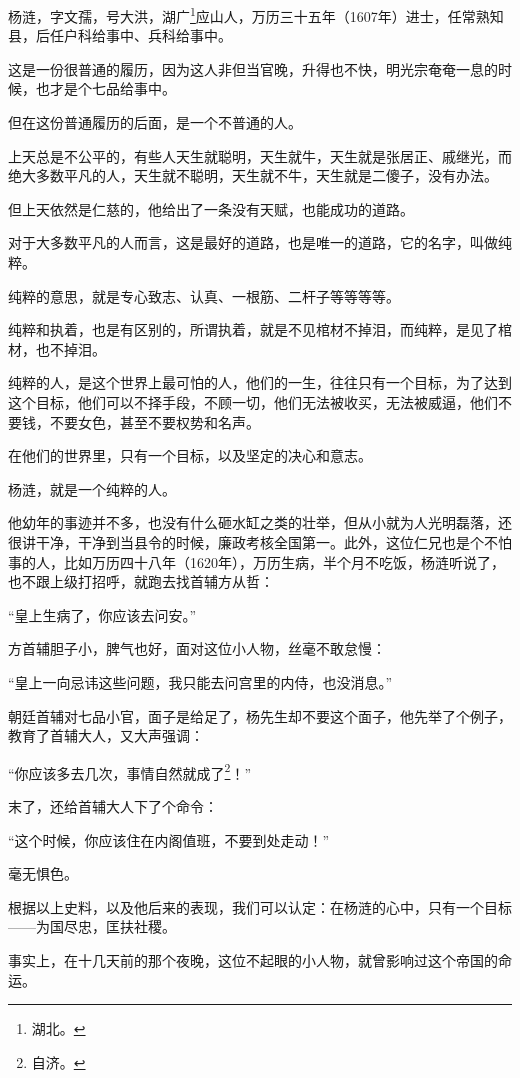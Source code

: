 \begin{multicols}{\theparacolNo}
杨涟，字文孺，号大洪，湖广\footnote{湖北。}应山人，万历三十五年（1607年）进士，任常熟知县，后任户科给事中、兵科给事中。

这是一份很普通的履历，因为这人非但当官晚，升得也不快，明光宗奄奄一息的时候，也才是个七品给事中。

但在这份普通履历的后面，是一个不普通的人。

上天总是不公平的，有些人天生就聪明，天生就牛，天生就是张居正、戚继光，而绝大多数平凡的人，天生就不聪明，天生就不牛，天生就是二傻子，没有办法。

但上天依然是仁慈的，他给出了一条没有天赋，也能成功的道路。

对于大多数平凡的人而言，这是最好的道路，也是唯一的道路，它的名字，叫做纯粹。

纯粹的意思，就是专心致志、认真、一根筋、二杆子等等等等。

纯粹和执着，也是有区别的，所谓执着，就是不见棺材不掉泪，而纯粹，是见了棺材，也不掉泪。

纯粹的人，是这个世界上最可怕的人，他们的一生，往往只有一个目标，为了达到这个目标，他们可以不择手段，不顾一切，他们无法被收买，无法被威逼，他们不要钱，不要女色，甚至不要权势和名声。

在他们的世界里，只有一个目标，以及坚定的决心和意志。

杨涟，就是一个纯粹的人。

他幼年的事迹并不多，也没有什么砸水缸之类的壮举，但从小就为人光明磊落，还很讲干净，干净到当县令的时候，廉政考核全国第一。此外，这位仁兄也是个不怕事的人，比如万历四十八年（1620年），万历生病，半个月不吃饭，杨涟听说了，也不跟上级打招呼，就跑去找首辅方从哲：

“皇上生病了，你应该去问安。”

方首辅胆子小，脾气也好，面对这位小人物，丝毫不敢怠慢：

“皇上一向忌讳这些问题，我只能去问宫里的内侍，也没消息。”

朝廷首辅对七品小官，面子是给足了，杨先生却不要这个面子，他先举了个例子，教育了首辅大人，又大声强调：

“你应该多去几次，事情自然就成了\footnote{自济。}！”

末了，还给首辅大人下了个命令：

“这个时候，你应该住在内阁值班，不要到处走动！”

毫无惧色。

根据以上史料，以及他后来的表现，我们可以认定：在杨涟的心中，只有一个目标——为国尽忠，匡扶社稷。

事实上，在十几天前的那个夜晚，这位不起眼的小人物，就曾影响过这个帝国的命运。


\end{multicols}
